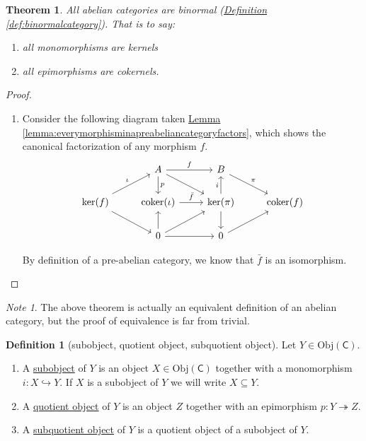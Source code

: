 \documentclass[a4paper]{report}
\newcommand{\defn}[1]{\ul{#1}}
\newcommand{\Obj}{\mathrm{Obj}}
\newcommand{\coker}{\mathrm{coker}}
\theoremstyle{definition}
\newtheorem{definition}{Definition}[section]
\theoremstyle{plain}
\newtheorem{theorem}{Theorem}[section]
\theoremstyle{remark}
\newtheorem{note}{Note}[section]
\begin{document}
\begin{theorem}
  All abelian categories are binormal (\hyperref[def:binormalcategory]{Definition \ref*{def:binormalcategory}}). That is to say: 
  \begin{enumerate}
    \item all monomorphisms are kernels
    \item all epimorphisms are cokernels.
  \end{enumerate}
\end{theorem}
\begin{proof}
  $\,$
  \begin{enumerate}
    \item Consider the following diagram taken \hyperref[lemma:everymorphisminapreabeliancategoryfactors]{Lemma \ref*{lemma:everymorphisminapreabeliancategoryfactors}}, which shows the canonical factorization of any morphism $f$.
      \begin{equation*}
        \begin{tikzcd}
          & A
          \arrow[r, "f"]
          \arrow[d, "p"]
          \arrow[dr]
          & B
          \arrow[dr, "\pi"]
          \\
          \ker(f)
          \arrow[ur, "\iota"]
          \arrow[dr]
          & \coker(\iota)
          \arrow[r, "\bar{f}"]
          & \ker(\pi)
          \arrow[u, "i"]
          \arrow[d]
          & \coker(f)
          \\
          & 0
          \arrow[u]
          \arrow[r]
          \arrow[ur]
          & 0
          \arrow[ur]
        \end{tikzcd}
      \end{equation*}

      By definition of a pre-abelian category, we know that $\bar{f}$ is an isomorphism.
  \end{enumerate}
\end{proof}

\begin{note}
  The above theorem is actually an equivalent definition of an abelian category, but the proof of equivalence is far from trivial.
\end{note}

\begin{definition}[subobject, quotient object, subquotient object]
  \label{def:subobjectquotientobject}
  Let $Y \in \Obj(\mathsf{C})$.
  \begin{enumerate}
    \item A \defn{subobject} of $Y$ is an object $X \in \Obj(\mathsf{C})$ together with a monomorphism $i\colon X \hookrightarrow Y$. If $X$ is a subobject of $Y$ we will write $X \subseteq Y$.
    \item A \defn{quotient object} of $Y$ is an object $Z$ together with an epimorphism $p\colon Y \twoheadrightarrow Z$.
    \item A \defn{subquotient object} of $Y$ is a quotient object of a subobject of $Y$.
  \end{enumerate}
\end{definition}
\end{document}
